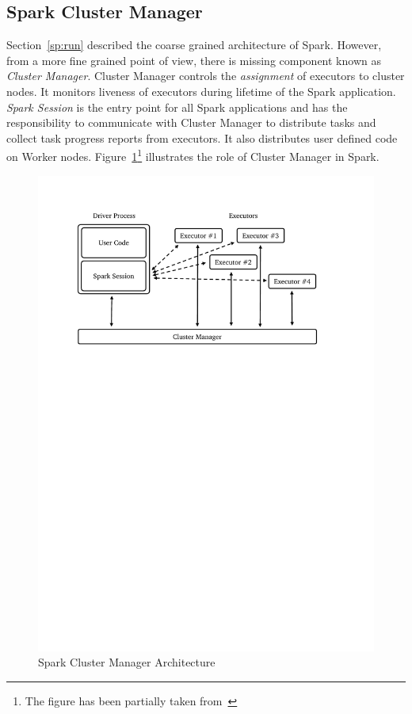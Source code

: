 \subsection{Spark Cluster Manager}
\label{sp:cluster}

Section~\ref{sp:run} described the coarse grained architecture of Spark. However, from a more fine grained point of view, there is missing component known as \emph{Cluster Manager}. Cluster Manager controls the \emph{assignment} of executors to cluster nodes. It monitors liveness of executors during lifetime of the Spark application. \emph{Spark Session} is the entry point for all Spark applications and has the responsibility to communicate with Cluster Manager to distribute tasks and collect task progress reports from executors. It also distributes user defined code on Worker nodes. Figure~\ref{fig:spark-cluster}\footnote{The figure has been partially taken from~\cite{spark-guide}} illustrates the role of Cluster Manager in Spark.
\begin{figure}[h]
    \centering
    \includegraphics[clip,trim=2.4cm 19cm 3.5cm 2cm]{spark-cluster.pdf}
    \caption[Spark Cluster Manager Architecture]{Spark Cluster Manager Architecture}
    \label{fig:spark-cluster}
\end{figure}

